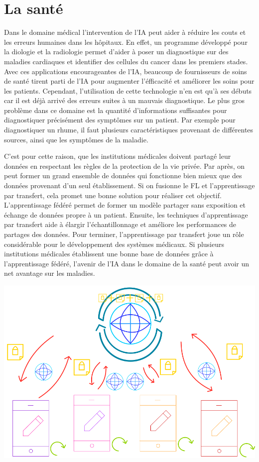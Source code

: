\documentclass[12pt,a4paper]{report}
\begin{document}
\section{La santé}

Dans le domaine médical l'intervention de l'IA peut aider à réduire les couts et les erreurs humaines dans les hôpitaux. En effet, un programme développé pour la diologie et la radiologie permet d'aider à poser un diagnostique sur des maladies cardiaques et identifier des cellules du cancer dans les premiers stades. Avec ces applications encourageantes de l'IA, beaucoup de fournisseurs de soins de santé tirent parti de l'IA pour augmenter l'éfficacité et améliorer les soins pour les patients. Cependant, l'utilisation de cette technologie n'en est qu'à ses débuts car il est déjà arrivé des erreurs suites à un mauvais diagnostique. Le plus gros problème dans ce domaine est la quantité d'informations suffisantes pour diagnostiquer précisément des symptômes sur un patient. Par exemple pour diagnostiquer un rhume, il faut plusieurs caractéristiques provenant de différentes sources, ainsi que les symptômes de la maladie.

C'est pour cette raison, que les institutions médicales doivent partagé leur données en respectant les règles de la protection de la vie privée. Par après, on peut former un grand ensemble de données qui fonctionne bien mieux que des données provenant d'un seul établissement. Si on fusionne le FL et l'apprentissage par transfert, cela promet une bonne solution pour réaliser cet objectif. L'apprentissage fédéré permet de former un modèle partager sans exposition et échange de données propre à un patient. Ensuite, les techniques d'apprentissage par transfert aide à élargir l'échantillonnage et améliore les performances de partages des données. Pour terminer, l'apprentissage par transfert joue un rôle considérable pour le développement des systèmes médicaux. Si plusieurs institutions médicales établissent une bonne base de données grâce à l'apprentissage fédéré, l'avenir de l'IA dans le domaine de la santé peut avoir un net avantage sur les maladies. 

\begin{center}
	\includegraphics[scale=0.5]{fl_medic}
	\label{fig1}
\end{center}
\end{document}
